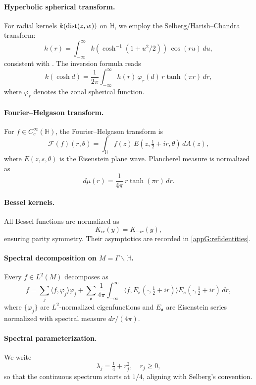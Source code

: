 \paragraph{Hyperbolic spherical transform.}  
For radial kernels $k(\operatorname{dist}(z,w))$ on $\mathbb{H}$, we employ the Selberg/Harish–Chandra transform:
\[
h(r) = \int_{-\infty}^\infty k(\cosh^{-1}(1+u^2/2))\, \cos(r u)\, du,
\]
consistent with \cite[Ch.~IV]{Helgason}.  
The inversion formula reads
\[
k(\cosh d) = \frac{1}{2\pi} \int_{-\infty}^\infty h(r)\, \varphi_r(d)\, r \tanh(\pi r)\, dr,
\]
where $\varphi_r$ denotes the zonal spherical function.  

\paragraph{Fourier–Helgason transform.}  
For $f\in C_c^\infty(\mathbb{H})$, the Fourier–Helgason transform is
\[
\mathcal{F}(f)(r,\theta) = \int_{\mathbb{H}} f(z)\, E(z,\tfrac{1}{2}+ir,\theta)\, dA(z),
\]
where $E(z,s,\theta)$ is the Eisenstein plane wave.  
Plancherel measure is normalized as
\[
d\mu(r) = \frac{1}{4\pi}\, r \tanh(\pi r)\, dr.
\]

\paragraph{Bessel kernels.}  
All Bessel functions are normalized as
\[
K_{ir}(y) = K_{-ir}(y),
\]
ensuring parity symmetry. Their asymptotics are recorded in \cref{appG:refidentities}.

\paragraph{Spectral decomposition on $M=\Gamma\backslash \mathbb H$.}  
Every $f\in L^2(M)$ decomposes as
\[
f = \sum_j \langle f, \varphi_j\rangle \varphi_j
+ \sum_{\mathfrak{a}} \frac{1}{4\pi} \int_{-\infty}^\infty 
   \langle f, E_{\mathfrak{a}}(\cdot,\tfrac{1}{2}+ir)\rangle
   E_{\mathfrak{a}}(\cdot,\tfrac{1}{2}+ir)\, dr,
\]
where $\{\varphi_j\}$ are $L^2$-normalized eigenfunctions and $E_{\mathfrak{a}}$ are Eisenstein series normalized with spectral measure $dr/(4\pi)$.  

\paragraph{Spectral parameterization.}  
We write
\[
\lambda_j = \tfrac{1}{4} + r_j^2, \quad r_j\ge 0,
\]
so that the continuous spectrum starts at $1/4$, aligning with Selberg’s convention.  

